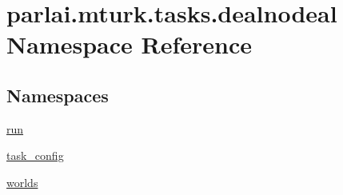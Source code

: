 \hypertarget{namespaceparlai_1_1mturk_1_1tasks_1_1dealnodeal}{}\section{parlai.\+mturk.\+tasks.\+dealnodeal Namespace Reference}
\label{namespaceparlai_1_1mturk_1_1tasks_1_1dealnodeal}
\subsection*{Namespaces}
\begin{DoxyCompactItemize}
\item 
 \hyperlink{namespaceparlai_1_1mturk_1_1tasks_1_1dealnodeal_1_1run}{run}
\item 
 \hyperlink{namespaceparlai_1_1mturk_1_1tasks_1_1dealnodeal_1_1task__config}{task\+\_\+config}
\item 
 \hyperlink{namespaceparlai_1_1mturk_1_1tasks_1_1dealnodeal_1_1worlds}{worlds}
\end{DoxyCompactItemize}
